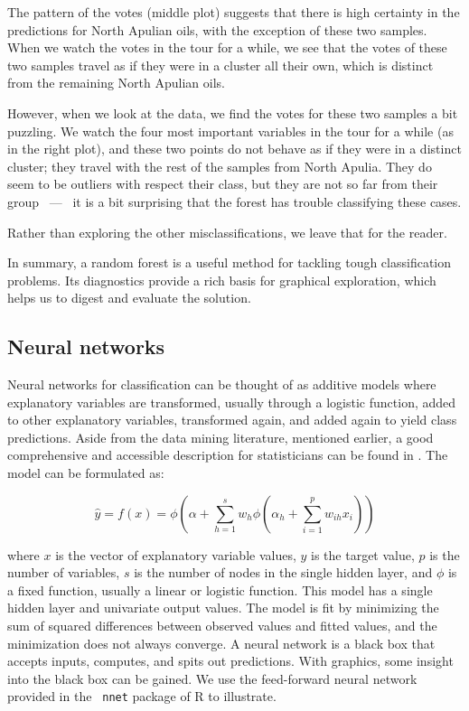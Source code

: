 The pattern of the votes (middle plot) suggests that there is high
certainty in the predictions for North Apulian oils, with the
exception of these two samples.  When we watch the votes in the tour
 for a while, we see that the votes of these two
samples travel as if they were in a cluster all their own, which is
distinct from the remaining North Apulian oils.

However, when we look at the data, we find the votes for these two
samples a bit puzzling.  We watch the four most important variables in
the tour for a while (as in the right plot), and these two points
do not behave as if they were in a distinct cluster; they travel with
the rest of the samples from North Apulia.  They do seem to be
outliers with respect their class, but they are not so far from their
group ~---~ it is a bit surprising that the forest has trouble
classifying these cases.

Rather than exploring the other misclassifications, we leave that for
the reader.

In summary, a random forest is a useful method for tackling tough
classification problems.  Its diagnostics provide a rich basis for
graphical exploration, which helps us to digest and evaluate the solution.

\subsection{Neural networks}

Neural networks for classification can be thought of as additive
models where explanatory variables are transformed, usually through a
logistic function, added to other explanatory variables, transformed
again, and added again to yield class predictions. Aside from the data
mining literature, mentioned earlier, a good comprehensive and
accessible description for statisticians can be found in
. The model can be formulated as:

\[
\hat{y} = f(x) = \phi(\alpha+\sum_{h=1}^{s}
w_{h}\phi(\alpha_h+\sum_{i=1}^{p} w_{ih}x_i))
\]


\noindent where $x$ is the vector of explanatory variable values, $y$
is the target value, $p$ is the number of variables, $s$ is the number
of nodes in the single hidden layer, and $\phi$ is a fixed function,
usually a linear or logistic function. This model has a single hidden
layer and univariate output values.  The model is fit by minimizing
the sum of squared differences between observed values and fitted
values, and the minimization does not always converge. A neural
network is a black box that accepts inputs, computes, and spits out
predictions.  With graphics, some insight into the black box can be
gained. We use the feed-forward neural network provided in the {\tt
nnet} package of R \cite{VR02} to illustrate.

